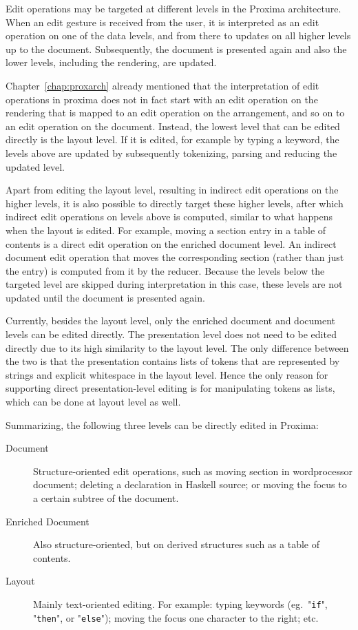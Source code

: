 
\bc Edit operations may be targeted at different levels in the Proxima architecture. When an edit gesture is received from the user, it is interpreted as an edit operation on one of the data levels, and from there to updates on all higher levels up to the document. Subsequently, the document is presented again and also the lower levels, including the rendering, are updated. \ec

Chapter~\ref{chap:proxarch} already mentioned that the interpretation of edit operations in proxima does not in fact start with an edit operation on the rendering that is mapped to an edit operation on the arrangement, and so on to an edit operation on the document. Instead, the lowest level that can be edited directly is the layout level. If it is edited, for example by typing a keyword, the levels above are updated by subsequently tokenizing, parsing and reducing the updated level.

Apart from editing the layout level, resulting in indirect edit operations on the higher levels, it is also possible to directly target these higher levels, after which indirect edit operations on levels above is computed, similar to what happens when the layout is edited. For example, moving a section entry in a table of contents is a direct edit operation on the enriched document level. An indirect document edit operation that moves the corresponding section (rather than just the entry) is computed from it by the reducer. Because the levels below the targeted level are skipped during interpretation in this case, these levels are not updated until the document is presented again. 

Currently, besides the layout level, only the enriched document and document levels can be edited directly. The presentation level does not need to be edited directly due to its high similarity to the layout level. The only difference between the two is that the presentation contains lists of tokens that are represented by strings and explicit whitespace in the layout level. Hence the only reason for supporting direct presentation-level editing is for manipulating tokens as lists, which can be done at layout level as well.

Summarizing, the following three levels can be directly edited in Proxima:

\begin{description}
\item[Document] Structure-oriented edit operations, such as moving section in wordprocessor document; deleting a declaration in Haskell source; or moving the focus to a certain subtree of the document.
\item[Enriched Document] Also structure-oriented, but on derived structures such as a table of contents.
\item[Layout] Mainly text-oriented editing. For example: typing keywords (eg.\ "\verb|if|", "\verb|then|", or "\verb|else|"); moving the focus one character to the right; etc.
\end{description}

